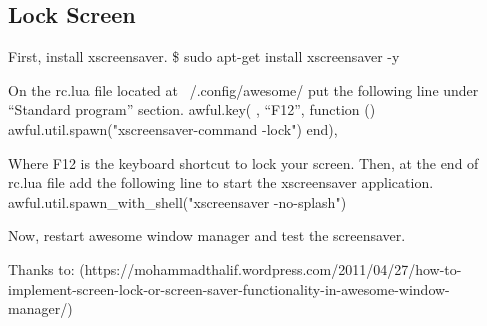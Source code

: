\subsection{Lock Screen}
First, install xscreensaver.
	\$ sudo apt-get install xscreensaver -y

On the rc.lua file located at ~/.config/awesome/ put the following line under “Standard program” section.
	awful.key({ }, ``F12'', function () awful.util.spawn("xscreensaver-command -lock") end),

Where F12 is the keyboard shortcut to lock your screen. Then, at the end of rc.lua file add the following line to start the xscreensaver application.
	awful.util.spawn_with_shell("xscreensaver -no-splash")

Now, restart awesome window manager and test the screensaver.

Thanks to: (https://mohammadthalif.wordpress.com/2011/04/27/how-to-implement-screen-lock-or-screen-saver-functionality-in-awesome-window-manager/)
